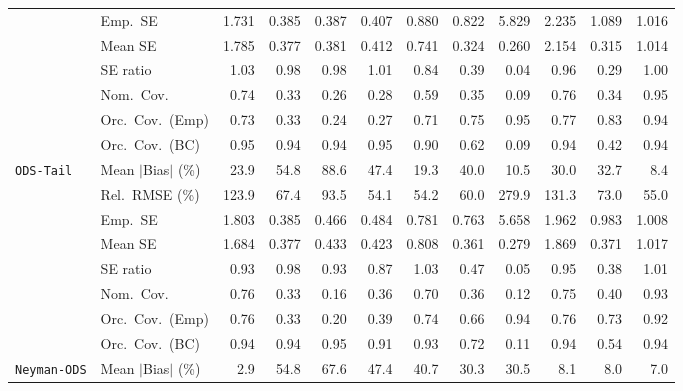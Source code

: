 \begin{landscape}
\begin{longtable}{llrrrrrrrrrr}
 & Emp.\ SE & 1.731 & 0.385 & 0.387 & 0.407 & 0.880 & 0.822 & 5.829 & 2.235 & 1.089 & 1.016 \\
 & Mean SE & 1.785 & 0.377 & 0.381 & 0.412 & 0.741 & 0.324 & 0.260 & 2.154 & 0.315 & 1.014 \\
 & SE ratio & 1.03 & 0.98 & \cellcolor{rankthree}0.98 & \cellcolor{ranktwo}1.01 & 0.84 & 0.39 & 0.04 & 0.96 & 0.29 & \cellcolor{rankone}1.00 \\
 & Nom.\ Cov. & \cellcolor{rankthree}0.74 & 0.33 & 0.26 & 0.28 & 0.59 & 0.35 & 0.09 & \cellcolor{ranktwo}0.76 & 0.34 & \cellcolor{rankone}0.95 \\
 & Orc.\ Cov.\ (Emp) & 0.73 & 0.33 & 0.24 & 0.27 & 0.71 & 0.75 & \cellcolor{rankone}0.95 & 0.77 & \cellcolor{rankthree}0.83 & \cellcolor{ranktwo}0.94 \\
 & Orc.\ Cov.\ (BC) & \cellcolor{ranktwo}0.95 & \cellcolor{rankthree}0.94 & 0.94 & \cellcolor{rankone}0.95 & 0.90 & 0.62 & 0.09 & 0.94 & 0.42 & 0.94 \\
\addlinespace[2pt]
\quad \texttt{ODS-Tail} & Mean $|$Bias$|$ (\%) & 23.9 & 54.8 & 88.6 & 47.4 & \cellcolor{rankthree}19.3 & 40.0 & \cellcolor{ranktwo}10.5 & 30.0 & 32.7 & \cellcolor{rankone}8.4 \\
 & Rel.\ RMSE (\%) & 123.9 & 67.4 & 93.5 & \cellcolor{rankone}54.1 & \cellcolor{ranktwo}54.2 & 60.0 & 279.9 & 131.3 & 73.0 & \cellcolor{rankthree}55.0 \\
 & Emp.\ SE & 1.803 & 0.385 & 0.466 & 0.484 & 0.781 & 0.763 & 5.658 & 1.962 & 0.983 & 1.008 \\
 & Mean SE & 1.684 & 0.377 & 0.433 & 0.423 & 0.808 & 0.361 & 0.279 & 1.869 & 0.371 & 1.017 \\
 & SE ratio & 0.93 & \cellcolor{ranktwo}0.98 & 0.93 & 0.87 & \cellcolor{rankthree}1.03 & 0.47 & 0.05 & 0.95 & 0.38 & \cellcolor{rankone}1.01 \\
 & Nom.\ Cov. & \cellcolor{ranktwo}0.76 & 0.33 & 0.16 & 0.36 & 0.70 & 0.36 & 0.12 & \cellcolor{rankthree}0.75 & 0.40 & \cellcolor{rankone}0.93 \\
 & Orc.\ Cov.\ (Emp) & 0.76 & 0.33 & 0.20 & 0.39 & 0.74 & 0.66 & \cellcolor{rankone}0.94 & \cellcolor{rankthree}0.76 & 0.73 & \cellcolor{ranktwo}0.92 \\
 & Orc.\ Cov.\ (BC) & \cellcolor{rankthree}0.94 & \cellcolor{ranktwo}0.94 & \cellcolor{rankone}0.95 & 0.91 & 0.93 & 0.72 & 0.11 & 0.94 & 0.54 & 0.94 \\
\addlinespace[2pt]
\quad \texttt{Neyman-ODS} & Mean $|$Bias$|$ (\%) & \cellcolor{rankone}2.9 & 54.8 & 67.6 & 47.4 & 40.7 & 30.3 & 30.5 & 8.1 & \cellcolor{rankthree}8.0 & \cellcolor{ranktwo}7.0 \\

\end{longtable}
\end{landscape}
